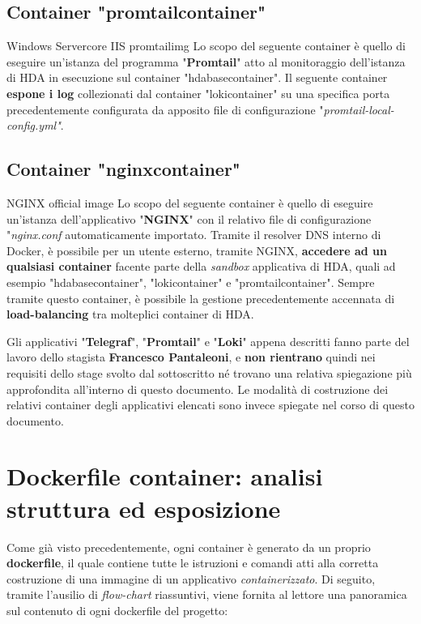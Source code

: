 \subsection{Container "promtailcontainer"}
\begin{namespacedesc}
	 {Windows Servercore IIS}
	 {promtailimg}
	 {Lo scopo del seguente container è quello di eseguire un'istanza del programma "\textbf{Promtail}" atto al monitoraggio dell'istanza di HDA in esecuzione sul container "hdabasecontainer". Il seguente container \textbf{espone i log} collezionati dal container "lokicontainer" su una specifica porta precedentemente configurata da apposito file di configurazione "\textit{promtail-local-config.yml"}}.
\end{namespacedesc}	

\subsection{Container "nginxcontainer"}
\begin{namespacedesc}
	 {NGINX official image}
	 {Lo scopo del seguente container è quello di eseguire un'istanza dell'applicativo "\textbf{NGINX}" con il relativo file di configurazione "\textit{nginx.conf} automaticamente importato. Tramite il resolver DNS interno di Docker, è possibile per un utente esterno, tramite NGINX, \textbf{accedere ad un qualsiasi container} facente parte della \textit{sandbox} applicativa di HDA, quali ad esempio "hdabasecontainer", "lokicontainer" e "promtailcontainer". Sempre tramite questo container, è possibile la gestione precedentemente accennata di \textbf{load-balancing} tra molteplici container di HDA.}
\end{namespacedesc}
Gli applicativi "\textbf{Telegraf}", "\textbf{Promtail}" e "\textbf{Loki}" appena descritti fanno parte del lavoro dello stagista \textbf{Francesco Pantaleoni}, e \textbf{non rientrano} quindi nei requisiti dello stage svolto dal sottoscritto né trovano una relativa spiegazione più approfondita all'interno di questo documento. Le modalità di costruzione dei relativi container degli applicativi elencati sono invece spiegate nel corso di questo documento.

\newpage	

\section{Dockerfile container: analisi struttura ed esposizione}
Come già visto precedentemente, ogni container è generato da un proprio \textbf{dockerfile}, il quale contiene tutte le istruzioni e comandi atti alla corretta costruzione di una immagine di un applicativo \textit{containerizzato}.
Di seguito, tramite l'ausilio di \textit{\gls{flow-chart}} riassuntivi, viene fornita al lettore una panoramica sul contenuto di ogni dockerfile del progetto:
